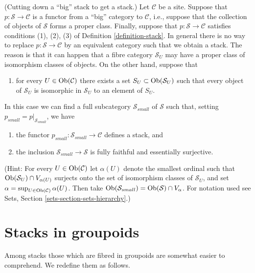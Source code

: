 \begin{remark}
\label{remark-stack-make-small}
(Cutting down a ``big'' stack to get a stack.)
Let $\mathcal{C}$ be a site. Suppose that $p : \mathcal{S} \to \mathcal{C}$
is a functor from a ``big'' category to $\mathcal{C}$, i.e., suppose
that the collection of objects of $\mathcal{S}$ forms a proper class.
Finally, suppose that $p : \mathcal{S} \to \mathcal{C}$ satisfies
conditions (1), (2), (3) of
Definition \ref{definition-stack}.
In general there is no way to replace $p : \mathcal{S} \to \mathcal{C}$
by an equivalent category such that we obtain a stack. The reason is that
it can happen that a fibre category $\mathcal{S}_U$ may have a proper
class of isomorphism classes of objects.
On the other hand, suppose that
\begin{enumerate}
\item[(4)] for every $U \in \mathop{\mathrm{Ob}}\nolimits(\mathcal{C})$ there exists a set
$S_U \subset \mathop{\mathrm{Ob}}\nolimits(\mathcal{S}_U)$ such that every object of
$\mathcal{S}_U$ is isomorphic in $\mathcal{S}_U$ to an element of $S_U$.
\end{enumerate}
In this case we can find a full subcategory $\mathcal{S}_{small}$
of $\mathcal{S}$ such that, setting $p_{small} = p|_{\mathcal{S}_{small}}$,
we have
\begin{enumerate}
\item[(a)] the functor $p_{small} : \mathcal{S}_{small} \to \mathcal{C}$
defines a stack, and
\item[(b)] the inclusion $\mathcal{S}_{small} \to \mathcal{S}$
is fully faithful and essentially surjective.
\end{enumerate}
(Hint: For every $U \in \mathop{\mathrm{Ob}}\nolimits(\mathcal{C})$
let $\alpha(U)$ denote the smallest ordinal such that
$\mathop{\mathrm{Ob}}\nolimits(\mathcal{S}_U) \cap V_{\alpha(U)}$ surjects onto the set
of isomorphism classes of $\mathcal{S}_U$, and set
$\alpha = \sup_{U \in \mathop{\mathrm{Ob}}\nolimits(\mathcal{C})} \alpha(U)$.
Then take
$\mathop{\mathrm{Ob}}\nolimits(\mathcal{S}_{small}) = \mathop{\mathrm{Ob}}\nolimits(\mathcal{S}) \cap V_\alpha$.
For notation used see Sets, Section \ref{sets-section-sets-hierarchy}.)
\end{remark}







\section{Stacks in groupoids}
\label{section-stacks-in-groupoids}

\noindent
Among stacks those which are fibred in groupoids are somewhat easier
to comprehend. We redefine them as follows.

